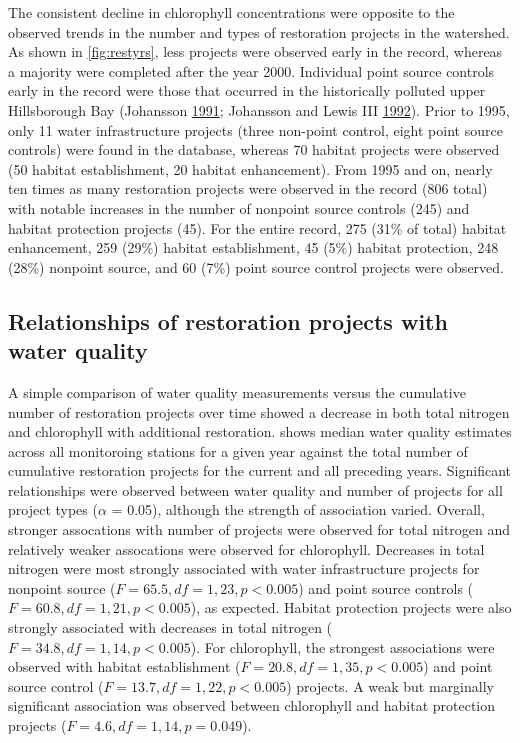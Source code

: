 \documentclass[]{article}
\begin{document}
The consistent decline in chlorophyll concentrations were opposite to
the observed trends in the number and types of restoration projects in
the watershed. As shown in \cref{fig:restyrs}, less projects were
observed early in the record, whereas a majority were completed after
the year 2000. Individual point source controls early in the record were
those that occurred in the historically polluted upper Hillsborough Bay
(Johansson \protect\hyperlink{ref-Johansson91}{1991}; Johansson and
Lewis III \protect\hyperlink{ref-Johansson92}{1992}). Prior to 1995,
only 11 water infrastructure projects (three non-point control, eight
point source controls) were found in the database, whereas 70 habitat
projects were observed (50 habitat establishment, 20 habitat
enhancement). From 1995 and on, nearly ten times as many restoration
projects were observed in the record (806 total) with notable increases
in the number of nonpoint source controls (245) and habitat protection
projects (45). For the entire record, 275 (31\% of total) habitat
enhancement, 259 (29\%) habitat establishment, 45 (5\%) habitat
protection, 248 (28\%) nonpoint source, and 60 (7\%) point source
control projects were observed.

\hypertarget{relationships-of-restoration-projects-with-water-quality}{%
\subsection{Relationships of restoration projects with water
quality}\label{relationships-of-restoration-projects-with-water-quality}}

A simple comparison of water quality measurements versus the cumulative
number of restoration projects over time showed a decrease in both total
nitrogen and chlorophyll with additional restoration. 
shows median water quality estimates across all monitoroing stations for
a given year against the total number of cumulative restoration projects
for the current and all preceding years. Significant relationships were
observed between water quality and number of projects for all project
types (\(\alpha\) = 0.05), although the strength of association varied.
Overall, stronger assocations with number of projects were observed for
total nitrogen and relatively weaker assocations were observed for
chlorophyll. Decreases in total nitrogen were most strongly associated
with water infrastructure projects for nonpoint source
(\(F=65.5, df = 1, 23, p < 0.005\)) and point source controls
(\(F=60.8, df = 1, 21, p < 0.005\)), as expected. Habitat protection
projects were also strongly associated with decreases in total nitrogen
(\(F=34.8, df = 1, 14, p < 0.005\)). For chlorophyll, the strongest
associations were observed with habitat establishment
(\(F=20.8, df = 1, 35, p< 0.005\)) and point source control
(\(F=13.7, df = 1, 22, p < 0.005\)) projects. A weak but marginally
significant association was observed between chlorophyll and habitat
protection projects (\(F=4.6, df = 1, 14, p = 0.049\)).
\end{document}
